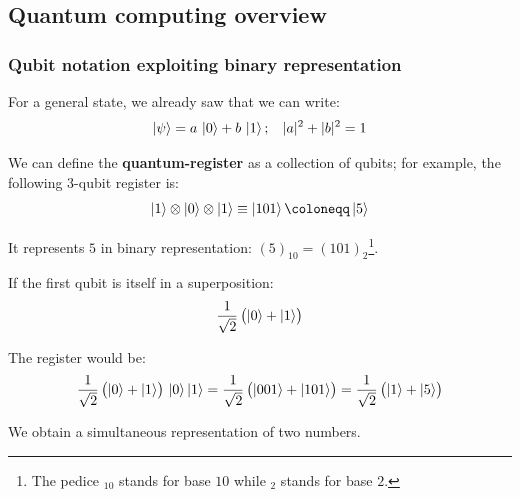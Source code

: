 \subsection{Quantum computing overview}\label{subsec:17-quantum-computing-overview}

\subsubsection{Qubit notation exploiting binary representation}

For a general state, we already saw that we can write: 
\begin{equation*}
\ket{\psi} = a \, \ket{0}+b\, \ket{1}; \hspace{2ex} |a|^2+|b|^2 = 1
\end{equation*}

We can define the \textbf{quantum-register} as a collection of qubits; for example, the following 3-qubit register is:
\begin{equation}\label{eqn:16-5-in-binary-representation}
\ket{1}\otimes\ket{0}\otimes\ket{1} \equiv 
\ket{101} \coloneqq \ket{5}
\end{equation}

It represents $5$ in binary representation: $(5)_{10} = (101)_2$\footnote{The pedice $_{10}$ stands for base $10$ while $_{2}$ stands for base $2$.}.

If the first qubit is itself in a superposition:
\begin{equation*}
\frac{1}{\sqrt{2}}\,\bigl(\ket{0}+\ket{1}\bigr)
\end{equation*}

The register would be:
\begin{equation*}
\frac{1}{\sqrt{2}}\,
\bigl(\ket{0}+\ket{1}\bigr) \, \ket{0}\ket{1} = 
\frac{1}{\sqrt{2}}\, 
\bigl(\ket{001}+\ket{101}\bigr) = 
\frac{1}{\sqrt{2}}\, 
\bigl(\ket{1}+\ket{5}\bigr)
\end{equation*}

We obtain a simultaneous representation of two numbers. 

